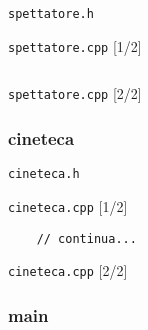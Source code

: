 \documentclass[xcolor={dvipsnames, svgnames, x11names, table}, 10pt]{beamer}
\begin{document}
\begin{frame}{\texttt{spettatore.h}}

    
\end{frame}

\begin{frame}{\texttt{spettatore.cpp} [1/2]}

\begin{columns}
    \column{\dimexpr\paperwidth-30pt}
\end{columns}
    
\end{frame}

\begin{frame}{\texttt{spettatore.cpp} [2/2]}
    
    
\end{frame}

\subsubsection{cineteca}

\begin{frame}{\texttt{cineteca.h}}
    
    
\end{frame}

\begin{frame}[fragile]{\texttt{cineteca.cpp} [1/2]}
    
    
    \begin{verbatim}
    // continua...
    \end{verbatim}
    
\end{frame}

\begin{frame}{\texttt{cineteca.cpp} [2/2]}
    
    
\end{frame}

\subsubsection{main}
\end{document}
